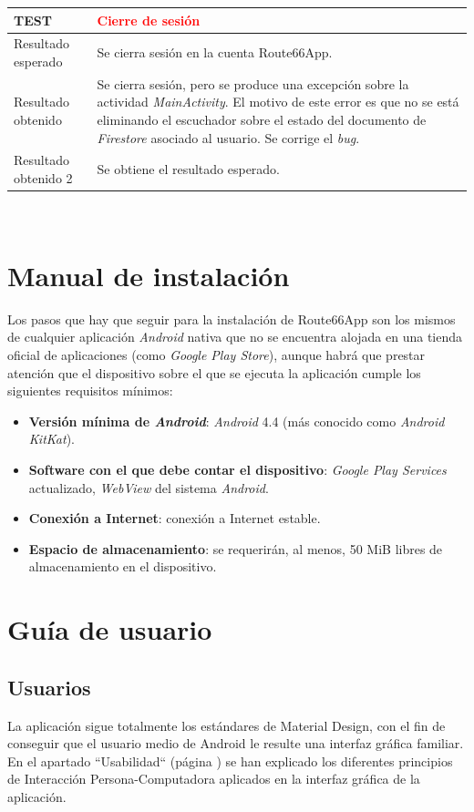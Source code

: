 \documentclass[twoside]{report}
\newcommand\addrow[2]{#1 &#2\\ }
\newcommand\addheading[2]{#1 &#2\\ \hline}
\newcommand\tabularhead{\begin{tabular}{lp{0.7\textwidth}}
\hline
}
\newenvironment{test}{\tabularhead}
{\hline\end{tabular}}
\begin{document}
\vspace{0.5cm}

\begin{test}
 \addheading{\textbf{TEST\arabic{test}}}{\textcolor{red}{Cierre de sesión}}
 \addrow{Resultado esperado}{Se cierra sesión en la cuenta Route66App.}
 \addrow{Resultado obtenido}{Se cierra sesión, pero se produce una excepción sobre la actividad 			\textit{MainActivity}. El motivo de este error es que no se está eliminando el escuchador sobre el estado del documento de \textit{Firestore} asociado al usuario. Se corrige el \textit{bug}.}
 \addrow{Resultado obtenido 2}{Se obtiene el resultado esperado.}
\end{test}\\


\section{Manual de instalación}

Los pasos que hay que seguir para la instalación de Route66App son los mismos de cualquier aplicación \textit{Android} nativa que no se encuentra alojada en una tienda oficial de aplicaciones (como \textit{Google Play Store}), aunque habrá que prestar atención que el dispositivo sobre el que se ejecuta la aplicación cumple los siguientes requisitos mínimos:

\begin{itemize}
	\item \textbf{Versión mínima de \textit{Android}}: \textit{Android} 4.4 (más conocido como \textit{Android KitKat}).
	\item \textbf{Software con el que debe contar el dispositivo}: \textit{Google Play Services} actualizado, \textit{WebView} del sistema \textit{Android}.
	\item \textbf{Conexión a Internet}: conexión a Internet estable.
	\item \textbf{Espacio de almacenamiento}: se requerirán, al menos, 50 MiB libres de almacenamiento en el dispositivo.
\end{itemize}

\section{Guía de usuario}

\subsection{Usuarios}
La aplicación sigue totalmente los estándares de Material Design, con el fin de conseguir que el usuario medio de Android le resulte una interfaz gráfica familiar. En el apartado “Usabilidad“ (página \pageref{usabilitymatters}) se han explicado los diferentes principios de Interacción Persona-Computadora aplicados en la interfaz gráfica de la aplicación.\\
\end{document}
